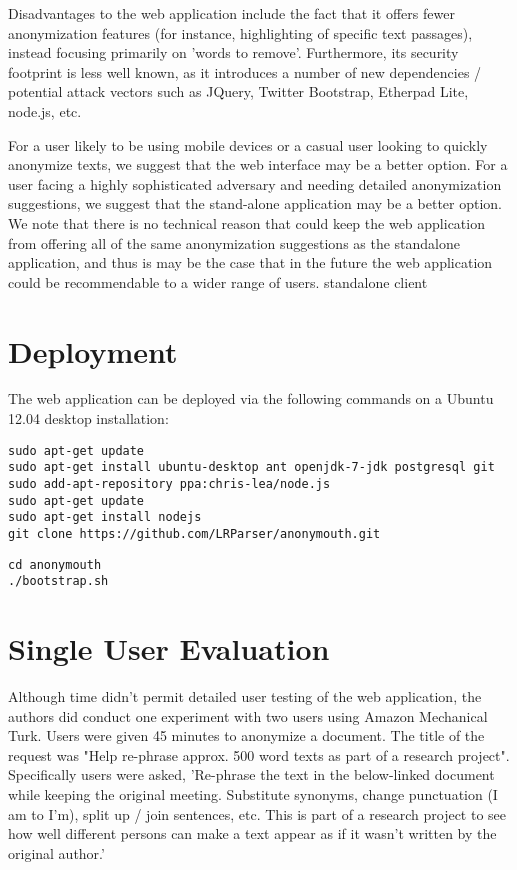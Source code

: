\documentclass[letterpaper]{article}
\begin{document}
Disadvantages to the web application include the fact that it offers fewer anonymization
features (for instance, highlighting of specific text passages),
instead focusing primarily on 'words to remove'. Furthermore, its
security footprint is less well known, as it introduces a number of
new dependencies / potential attack vectors such as JQuery, Twitter
Bootstrap, Etherpad Lite, node.js, etc.

For a user likely to be using
mobile devices or a casual user looking to quickly anonymize texts,
we suggest that the web interface may be a better option. For a user
facing a highly sophisticated adversary and needing detailed
anonymization suggestions, we suggest that the stand-alone application
may be a better option. We note that there is no technical reason that
could keep the web application from offering all of the same
anonymization suggestions as the standalone application, and thus is
may be the case that in the future the web application could be
recommendable to a wider range of users.
standalone client

\section{Deployment}

The web application can be deployed via the following commands on a
Ubuntu 12.04 desktop installation:

\begin{lstlisting}[caption={Install Dependencies},label={lst:install}]
sudo apt-get update
sudo apt-get install ubuntu-desktop ant openjdk-7-jdk postgresql git
sudo add-apt-repository ppa:chris-lea/node.js
sudo apt-get update
sudo apt-get install nodejs
git clone https://github.com/LRParser/anonymouth.git
\end{lstlisting}

\begin{lstlisting}[caption={Start Service},label={lst:start}]
cd anonymouth
./bootstrap.sh
\end{lstlisting}

\section{Single User Evaluation}

Although time didn't permit detailed user testing of the web
application, the authors did conduct one experiment with two users
using Amazon Mechanical Turk. Users were given 45 minutes to anonymize
a document. The title of the request was "Help re-phrase approx. 500
word texts as part of a research project". Specifically users were
asked, 'Re-phrase the text in the below-linked document while keeping
the original meeting. Substitute synonyms, change punctuation (I am to
I'm), split up / join sentences, etc. This is part of a research
project to see how well different persons can make a text appear as if
it wasn't written by the original author.'
\end{document}
